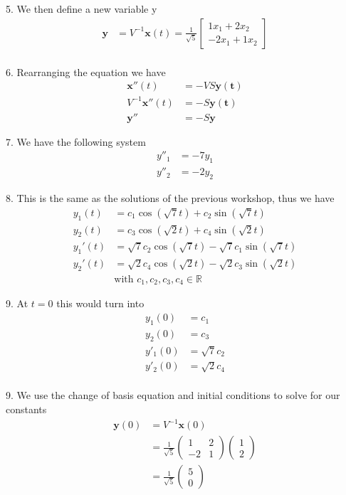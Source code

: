 \documentclass[12pt]{article}
\begin{document}
5. We then define a new variable y
\begin{align*}
    \mathbf{y} & = V^{-1}\mathbf{x}(t) = \frac{1}{\sqrt{5}} \begin{bmatrix} 1x_1+2x_2 \\ -2x_1+1x_2\end{bmatrix} \\
\end{align*}

6. Rearranging the equation we have
\begin{align*}
    \mathbf{x}''(t)       & = -VS\mathbf{y(t)} \\
    V^{-1}\mathbf{x}''(t) & = -S\mathbf{y(t)}  \\
    \mathbf{y}''          & = -S\mathbf{y}
\end{align*}

7. We have the following system
\begin{align*}
    y''_1 & = -7y_1 \\
    y''_2 & = -2y_2
\end{align*}

8. This is the same as the solutions of the previous workshop, thus we have
\begin{align*}
    y_1(t)  & = c_1\cos(\sqrt{7}t) + c_2\sin(\sqrt{7}t)                \\
    y_2(t)  & = c_3\cos(\sqrt{2}t) + c_4\sin(\sqrt{2}t)                \\
    y_1'(t) & = \sqrt{7}c_2\cos(\sqrt{7}t) -\sqrt{7}c_1\sin(\sqrt{7}t) \\
    y_2'(t) & = \sqrt{2}c_4\cos(\sqrt{2}t) -\sqrt{2}c_3\sin(\sqrt{2}t) \\
            & \text{with } c_1, c_2, c_3, c_4 \in{\mathbb{R}}
\end{align*}

9. At $t=0$ this would turn into
\begin{align*}
    y_1(0)  & = c_1         \\
    y_2(0)  & = c_3         \\
    y'_1(0) & = \sqrt{7}c_2 \\
    y'_2(0) & = \sqrt{2}c_4 \\
\end{align*}

9. We use the change of basis equation and initial conditions to solve for our constants
\begin{align*}
    \mathbf{y}(0) & = V^{-1}\mathbf{x}(0)                                                                                  \\
                  & = \frac{1}{\sqrt{5}}\begin{pmatrix} 1 & 2 \\ -2 & 1 \end{pmatrix} \begin{pmatrix} 1 \\ 2 \end{pmatrix} \\
                  & = \frac{1}{\sqrt{5}}\begin{pmatrix} 5 \\ 0  \end{pmatrix}
\end{align*}
\end{document}
